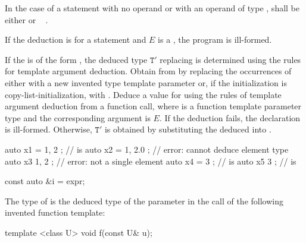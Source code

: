 In the case of a  statement with no operand
or with an operand of type ,
 shall be either
  or
\cv{}~ .

\pnum
If the deduction is for a  statement
and $E$ is a ,
the program is ill-formed.

\pnum
If the  is of the form
 ,
the deduced type
$\mathtt{T}'$ replacing 
is determined using the rules for template argument deduction.
Obtain  from
 by replacing the occurrences of
  either with
a new invented type template parameter  or,
if the initialization is copy-list-initialization, with
. Deduce a value for  using the rules
of template argument deduction from a function call,
where  is a
function template parameter type and
the corresponding argument is $E$.
If the deduction fails, the declaration is ill-formed.
Otherwise, $\mathtt{T}'$ is obtained by
substituting the deduced  into .
\begin{example}
\begin{codeblock}
auto x1 = { 1, 2 };             //  is 
auto x2 = { 1, 2.0 };           // error: cannot deduce element type
auto x3{ 1, 2 };                // error: not a single element
auto x4 = { 3 };                //  is 
auto x5{ 3 };                   //  is 
\end{codeblock}
\end{example}

\begin{example}
\begin{codeblock}
const auto &i = expr;
\end{codeblock}
The type of  is the deduced type of the parameter  in
the call  of the following invented function template:
\begin{codeblock}
template <class U> void f(const U& u);
\end{codeblock}
\end{example}


